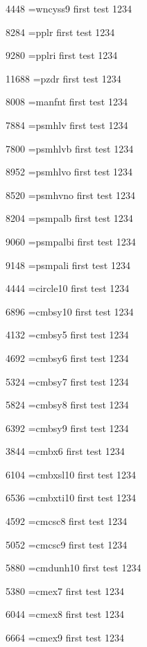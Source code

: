 4448	\tstfont \font\tstfont=wncyss9 first test 1234 

8284	\tstfont \font\tstfont=pplr first test 1234 

9280	\tstfont \font\tstfont=pplri first test 1234 

11688	\tstfont \font\tstfont=pzdr first test 1234 

8008	\tstfont \font\tstfont=manfnt first test 1234 

7884	\tstfont \font\tstfont=psmhlv first test 1234 

7800	\tstfont \font\tstfont=psmhlvb first test 1234 

8952	\tstfont \font\tstfont=psmhlvo first test 1234 

8520	\tstfont \font\tstfont=psmhvno first test 1234 

8204	\tstfont \font\tstfont=psmpalb first test 1234 

9060	\tstfont \font\tstfont=psmpalbi first test 1234 

9148	\tstfont \font\tstfont=psmpali first test 1234 

4444	\tstfont \font\tstfont=circle10 first test 1234 

6896	\tstfont \font\tstfont=cmbsy10 first test 1234 

4132	\tstfont \font\tstfont=cmbsy5 first test 1234 

4692	\tstfont \font\tstfont=cmbsy6 first test 1234 

5324	\tstfont \font\tstfont=cmbsy7 first test 1234 

5824	\tstfont \font\tstfont=cmbsy8 first test 1234 

6392	\tstfont \font\tstfont=cmbsy9 first test 1234 

3844	\tstfont \font\tstfont=cmbx6 first test 1234 

6104	\tstfont \font\tstfont=cmbxsl10 first test 1234 

6536	\tstfont \font\tstfont=cmbxti10 first test 1234 

4592	\tstfont \font\tstfont=cmcsc8 first test 1234 

5052	\tstfont \font\tstfont=cmcsc9 first test 1234 

5880	\tstfont \font\tstfont=cmdunh10 first test 1234 

5380	\tstfont \font\tstfont=cmex7 first test 1234 

6044	\tstfont \font\tstfont=cmex8 first test 1234 

6664	\tstfont \font\tstfont=cmex9 first test 1234 

